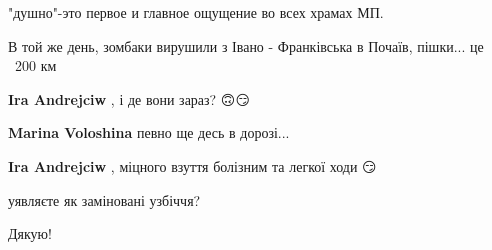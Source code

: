 \begin{itemize}
"душно"-это первое и главное ощущение во всех храмах МП.

 
В той же день, зомбаки вирушили з Івано - Франківська в Почаїв, пішки... це ~200 км

\begin{itemize}
 
\textbf{Ira Andrejciw} , і де вони зараз? 🙃😏

 
\textbf{Marina Voloshina} певно ще десь в дорозі...

 
\textbf{Ira Andrejciw} , міцного взуття болізним та легкої ходи 😏🤣

 
уявляєте як заміновані узбіччя?
\end{itemize}

 
Дякую!

 


\end{itemize}
